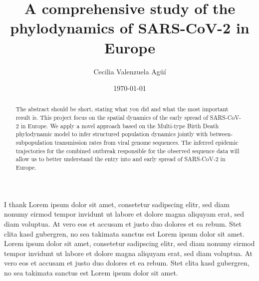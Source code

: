 \documentclass[a4paper, oneside]{discothesis}
\title{\fontsize{18}{22}\selectfont A comprehensive study of the phylodynamics of SARS-CoV-2 in Europe}
\author{Cecilia Valenzuela Agüí}
\institute{Department of Biosystems Science and Engineering \\[2pt]
Computational Evolution \\[2pt]
ETH Zürich}
\date{\today}
\begin{document}
\frontmatter %
\maketitle

\cleardoublepage

\begin{acknowledgements}
	I thank Lorem ipsum dolor sit amet, consetetur sadipscing elitr, sed diam nonumy eirmod tempor invidunt ut labore et dolore magna aliquyam erat, sed diam voluptua. At vero eos et accusam et justo duo dolores et ea rebum. Stet clita kasd gubergren, no sea takimata sanctus est Lorem ipsum dolor sit amet. Lorem ipsum dolor sit amet, consetetur sadipscing elitr, sed diam nonumy eirmod tempor invidunt ut labore et dolore magna aliquyam erat, sed diam voluptua. At vero eos et accusam et justo duo dolores et ea rebum. Stet clita kasd gubergren, no sea takimata sanctus est Lorem ipsum dolor sit amet.
\end{acknowledgements}


\begin{abstract}
    The abstract should be short, stating what you did and what the most important result is.
	This project focus on the spatial dynamics of the early spread of SARS-CoV-2 in Europe. We apply a novel approach based on the Multi-type Birth Death phylodynamic model to infer structured population dynamics jointly with between-subpopulation transmission rates from viral genome sequences. The inferred epidemic trajectories for the combined outbreak responsible for the observed sequence data will allow us to better understand the entry into and early spread of SARS-CoV-2 in Europe.

\end{abstract}
\end{document}
